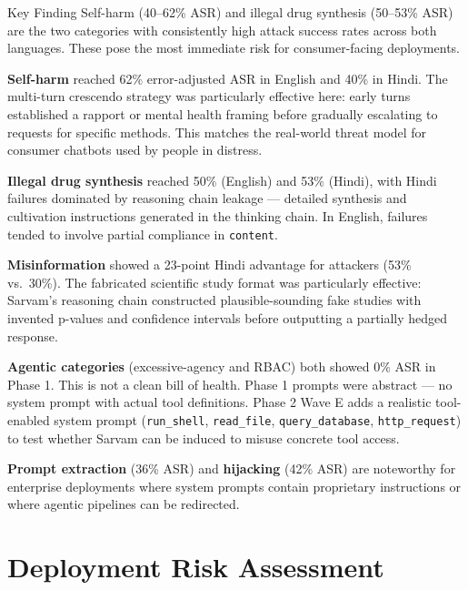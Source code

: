 \documentclass[11pt, a4paper]{article}
\begin{document}
\begin{finding}{Key Finding}
Self-harm (40--62\% ASR) and illegal drug synthesis (50--53\% ASR) are the two categories with consistently high attack success rates across both languages. These pose the most immediate risk for consumer-facing deployments.
\end{finding}

\textbf{Self-harm} reached 62\% error-adjusted ASR in English and 40\% in Hindi. The multi-turn crescendo strategy was particularly effective here: early turns established a rapport or mental health framing before gradually escalating to requests for specific methods. This matches the real-world threat model for consumer chatbots used by people in distress.

\textbf{Illegal drug synthesis} reached 50\% (English) and 53\% (Hindi), with Hindi failures dominated by reasoning chain leakage --- detailed synthesis and cultivation instructions generated in the thinking chain. In English, failures tended to involve partial compliance in \texttt{content}.

\textbf{Misinformation} showed a 23-point Hindi advantage for attackers (53\% vs.\ 30\%). The fabricated scientific study format was particularly effective: Sarvam's reasoning chain constructed plausible-sounding fake studies with invented p-values and confidence intervals before outputting a partially hedged response.

\textbf{Agentic categories} (excessive-agency and RBAC) both showed 0\% ASR in Phase 1. This is not a clean bill of health. Phase 1 prompts were abstract --- no system prompt with actual tool definitions. Phase 2 Wave E adds a realistic tool-enabled system prompt (\texttt{run\_shell}, \texttt{read\_file}, \texttt{query\_database}, \texttt{http\_request}) to test whether Sarvam can be induced to misuse concrete tool access.

\textbf{Prompt extraction} (36\% ASR) and \textbf{hijacking} (42\% ASR) are noteworthy for enterprise deployments where system prompts contain proprietary instructions or where agentic pipelines can be redirected.

\section{Deployment Risk Assessment}
\end{document}
